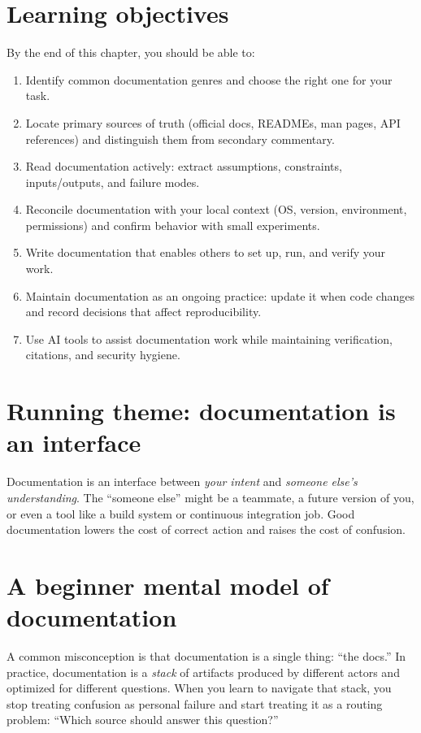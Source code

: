 \section*{Learning objectives}
By the end of this chapter, you should be able to:
\begin{enumerate}[noitemsep]
  \item Identify common documentation genres and choose the right one for your task.
  \item Locate primary sources of truth (official docs, READMEs, man pages, API references) and distinguish them from secondary commentary.
  \item Read documentation actively: extract assumptions, constraints, inputs/outputs, and failure modes.
  \item Reconcile documentation with your local context (OS, version, environment, permissions) and confirm behavior with small experiments.
  \item Write documentation that enables others to set up, run, and verify your work.
  \item Maintain documentation as an ongoing practice: update it when code changes and record decisions that affect reproducibility.
  \item Use AI tools to assist documentation work while maintaining verification, citations, and security hygiene.
\end{enumerate}

\section*{Running theme: documentation is an interface}
Documentation is an interface between \emph{your intent} and \emph{someone else’s understanding}. The “someone else” might be a teammate, a future version of you, or even a tool like a build system or continuous integration job. Good documentation lowers the cost of correct action and raises the cost of confusion.

\section{A beginner mental model of documentation}
A common misconception is that documentation is a single thing: “the docs.” In practice, documentation is a \emph{stack} of artifacts produced by different actors and optimized for different questions. When you learn to navigate that stack, you stop treating confusion as personal failure and start treating it as a routing problem: ``Which source should answer this question?''

